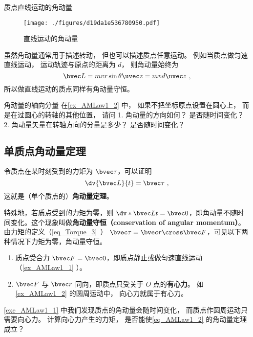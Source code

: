 \begin{example}{质点直线运动的角动量}\label{ex_AMLaw1_1}
\begin{figure}[ht]
\centering
\texttt{[image: ./figures/d19da1e536780950.pdf]}
\caption{直线运动的角动量} \label{fig_AMLaw1_2}
\end{figure}
虽然角动量通常用于描述转动， 但也可以描述质点任意运动。 例如当质点做匀速直线运动， 运动轨迹与原点的距离为 $d$， 则角动量始终为
\begin{equation}
\bvec L = mvr\sin\theta \uvec z =  mvd \uvec z~,
\end{equation}
所以做直线运动的质点同样有角动量守恒。
\end{example}

\begin{exercise}{角动量的轴向分量}\label{exe_AMLaw1_1}
在\autoref{ex_AMLaw1_2} 中， 如果不把坐标原点设置在圆心上， 而是在过圆心的转轴的其他位置， 请问 1. 角动量的方向如何？ 是否随时间变化？ 2. 角动量矢量在转轴方向的分量是多少？ 是否随时间变化？
\end{exercise}

\subsection{单质点角动量定理}
令质点在某时刻受到的力矩为 $\bvec \tau$，可以证明
\begin{equation}\label{eq_AMLaw1_2}
\dv{\bvec L}{t} = \bvec \tau~,
\end{equation} 
这就是（单个质点的）\textbf{角动量定理}。

特殊地，若质点受到的力矩为零，则 $ \dv*{\bvec L}{t} = \bvec 0$，即角动量不随时间变化。这个现象叫做\textbf{角动量守恒（conservation of angular momentum）}。由力矩的定义（\autoref{eq_Torque_3}~） $\bvec \tau = \bvec r \cross \bvec F$，可见以下两种情况下力矩为零，角动量守恒。
\begin{enumerate}
\item 质点受合力 $\bvec F= \bvec 0$，即质点静止或做匀速直线运动（\autoref{ex_AMLaw1_1} ）。
\item $\bvec F$ 与 $\bvec r$ 同向，即质点只受关于 $O$ 点的\textbf{有心力}。 如\autoref{ex_AMLaw1_2} 的圆周运动中， 向心力就属于有心力。
\end{enumerate}

\begin{exercise}{}
\autoref{exe_AMLaw1_1} 中我们发现质点的角动量会随时间变化， 而质点作圆周运动只需要向心力。 计算向心力产生的力矩， 是否能使\autoref{eq_AMLaw1_2} 的角动量定理成立？
\end{exercise}

